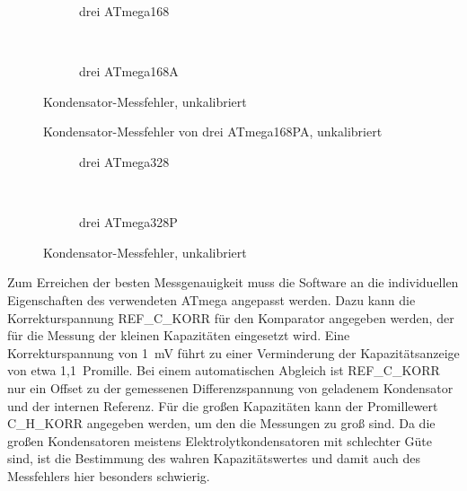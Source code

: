 \begin{figure}[H]
  \begin{subfigure}[b]{9cm}
    \centering
    \resizebox{9cm}{!}{}
    \caption{drei ATmega168}
    \label{fig:mega168all}
  \end{subfigure}
  ~
  \begin{subfigure}[b]{9cm}
    \centering
    \resizebox{9cm}{!}{}
    \caption{drei ATmega168A}
    \label{fig:mega168Aall}
  \end{subfigure}
  \caption{Kondensator-Messfehler, unkalibriert}
\end{figure}

\begin{figure}[H]
\centering

\caption{Kondensator-Messfehler von drei ATmega168PA, unkalibriert}
\label{fig:mega168PAall}
\end{figure}

\begin{figure}[H]
  \begin{subfigure}[b]{9cm}
    \centering
    \resizebox{9cm}{!}{}
    \caption{drei ATmega328}
    \label{fig:mega328all}
  \end{subfigure}
  ~
  \begin{subfigure}[b]{9cm}
    \centering
    \resizebox{9cm}{!}{}
    \caption{drei ATmega328P}
    \label{fig:mega328Pall}
  \end{subfigure}
  \caption{Kondensator-Messfehler, unkalibriert}
\end{figure}

Zum Erreichen der besten Messgenauigkeit muss die Software an die individuellen Eigenschaften des verwendeten ATmega
angepasst werden. Dazu kann die Korrekturspannung REF\_C\_KORR für den Komparator angegeben werden, der für die Messung der kleinen 
Kapazitäten eingesetzt wird. Eine Korrekturspannung von 1~mV führt zu einer Verminderung der Kapazitätsanzeige von etwa 1,1~Promille.
Bei einem automatischen Abgleich ist REF\_C\_KORR  nur ein Offset zu der gemessenen Differenzspannung von geladenem Kondensator
und der internen Referenz.
Für die großen Kapazitäten kann der Promillewert C\_H\_KORR angegeben werden, um den die Messungen
zu groß sind.
Da die großen Kondensatoren meistens Elektrolytkondensatoren mit schlechter Güte sind, ist die Bestimmung
des wahren Kapazitätswertes und damit auch des Messfehlers hier besonders schwierig.

